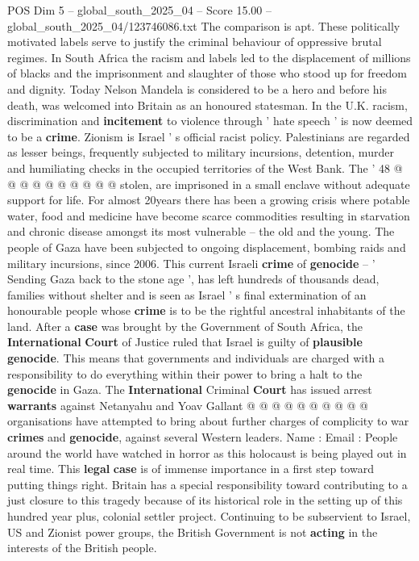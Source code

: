 \begin{textsample}{POS Dim 5 – global\_south\_2025\_04 – Score 15.00 – global\_south\_2025\_04/123746086.txt}
The comparison is apt.
These politically motivated labels serve to justify the criminal behaviour of oppressive brutal regimes.
In South Africa the racism and labels led to the displacement of millions of blacks and the imprisonment and slaughter of those who stood up for freedom and dignity.
Today Nelson Mandela is considered to be a hero and before his death, was welcomed into Britain as an honoured statesman.
In the U.K. racism, discrimination and \textbf{incitement} to violence through ' hate speech ' is now deemed to be a \textbf{crime}.
Zionism is Israel ' s official racist policy.
Palestinians are regarded as lesser beings, frequently subjected to military incursions, detention, murder and humiliating checks in the occupied territories of the West Bank.
The ' 48 @ @ @ @ @ @ @ @ @ @ stolen, are imprisoned in a small enclave without adequate support for life.
For almost 20years there has been a growing crisis where potable water, food and medicine have become scarce commodities resulting in starvation and chronic disease amongst its most vulnerable -- the old and the young.
The people of Gaza have been subjected to ongoing displacement, bombing raids and military incursions, since 2006.
This current Israeli \textbf{crime} of \textbf{genocide} -- ' Sending Gaza back to the stone age ', has left hundreds of thousands dead, families without shelter and is seen as Israel ' s final extermination of an honourable people whose \textbf{crime} is to be the rightful ancestral inhabitants of the land.
After a \textbf{case} was brought by the Government of South Africa, the \textbf{International} \textbf{Court} of Justice ruled that Israel is guilty of \textbf{plausible} \textbf{genocide}.
This means that governments and individuals are charged with a responsibility to do everything within their power to bring a halt to the \textbf{genocide} in Gaza.
The \textbf{International} Criminal \textbf{Court} has issued arrest \textbf{warrants} against Netanyahu and Yoav Gallant @ @ @ @ @ @ @ @ @ @ organisations have attempted to bring about further charges of complicity to war \textbf{crimes} and \textbf{genocide}, against several Western leaders.
Name : Email : People around the world have watched in horror as this holocaust is being played out in real time.
This \textbf{legal} \textbf{case} is of immense importance in a first step toward putting things right.
Britain has a special responsibility toward contributing to a just closure to this tragedy because of its historical role in the setting up of this hundred year plus, colonial settler project.
Continuing to be subservient to Israel, US and Zionist power groups, the British Government is not \textbf{acting} in the interests of the British people.

\end{textsample}
